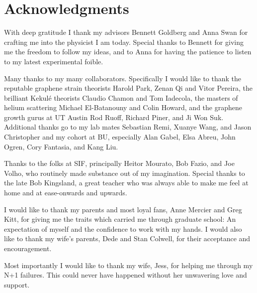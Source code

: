 \chapter*{Acknowledgments}
With deep gratitude I thank my advisors Bennett Goldberg and Anna Swan for crafting me into the physicist I am today.
Special thanks to Bennett for giving me the freedom to follow my ideas, and to Anna for having the patience to listen to my latest experimental foible.

Many thanks to my many collaborators.
Specifically I would like to thank the reputable graphene strain theorists Harold Park, Zenan Qi and Vitor Pereira, the brilliant Kekul\'e theorists Claudio Chamon and Tom Iadecola, the masters of helium scattering Michael El-Batanouny and Colin Howard, and the graphene growth gurus at UT Austin Rod Ruoff, Richard Piner, and Ji Won Suk.
Additional thanks go to my lab mates Sebastian Remi, Xuanye Wang, and Jason Christopher and my cohort at BU, especially Alan Gabel, Elsa Abreu, John Ogren, Cory Fantasia, and Kang Liu.

Thanks to the folks at SIF, principally Heitor Mourato, Bob Fazio, and Joe Volho, who routinely made substance out of my imagination.
Special thanks to the late Bob Kingsland, a great teacher who was always able to make me feel at home and at ease-onwards and upwards.

I would like to thank my parents and most loyal fans, Anne Mercier and Greg Kitt, for giving me the traits which carried me through graduate school: An expectation of myself and the confidence to work with my hands.
I would also like to thank my wife's parents, Dede and Stan Colwell, for their acceptance and encouragement.

Most importantly I would like to thank my wife, Jess, for helping me through my N+1 failures.
This could never have happened without her unwavering love and support.

\newpage